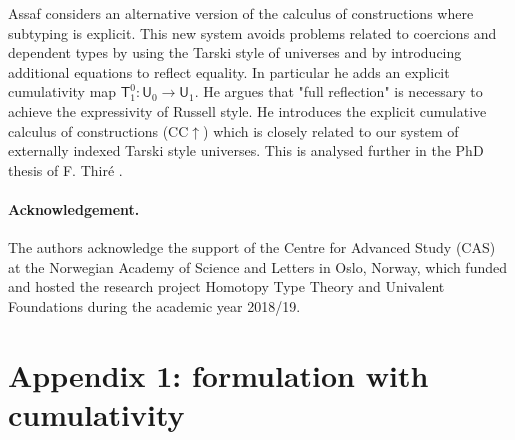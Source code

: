 \documentclass[11pt,a4paper]{article}
\theoremstyle{definition}
\newcommand{\UU}{\mathsf{U}}
\newcommand{\T}{\mathsf{T}}
\begin{document}
Assaf \cite{Assaf14} considers an alternative version of the calculus of
constructions where subtyping is explicit. This new system avoids problems related to coercions and dependent types by using the Tarski style
of universes and by introducing additional equations to reflect equality. In particular he adds an explicit cumulativity map $\T^0_1 : \UU_0 \to \UU_1$. He argues that "full reflection" is necessary to achieve the expressivity of Russell style. He introduces the explicit cumulative calculus of constructions (CC$\uparrow$) which is closely related to our system of externally indexed Tarski style universes.
This is analysed further in the PhD thesis of F. Thir\'e \cite{Thire20}.

\paragraph{Acknowledgement.}
The authors acknowledge the support of the Centre for Advanced Study (CAS)
at the Norwegian Academy of Science and Letters
in Oslo, Norway, which funded and hosted the research project Homotopy
Type Theory and Univalent Foundations during the academic year 2018/19.



\newpage

\section*{Appendix 1: formulation with cumulativity}

\end{document}
